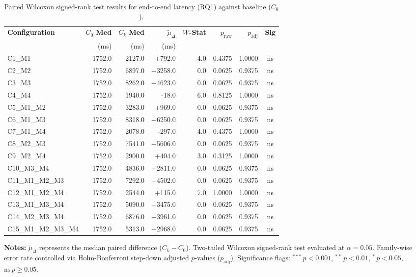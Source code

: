 \begin{table}[!htbp]
\centering
\small
\caption{Paired Wilcoxon signed-rank test results for end-to-end latency (RQ1) against baseline ($C_0$).}
\label{tab:wilcoxon_rq1}
\begin{tabular*}{\textwidth}{@{\extracolsep{\fill}} l r r r r r r c @{}}
\toprule
\textbf{Configuration} & \textbf{$C_0$ Med} & \textbf{$C_k$ Med} & \textbf{$\tilde{\mu}_\Delta$} & \textbf{$W$-Stat} & \textbf{$p_{\text{raw}}$} & \textbf{$p_{\text{adj}}$} & \textbf{Sig} \\
 & \scriptsize{(ms)} & \scriptsize{(ms)} & \scriptsize{(ms)} & & & & \\
\midrule
C1\_M1 & 1752.0 & 2127.0 & +792.0 & 4.0 & 0.4375 & 1.0000 & ns \\
C2\_M2 & 1752.0 & 6897.0 & +3258.0 & 0.0 & 0.0625 & 0.9375 & ns \\
C3\_M3 & 1752.0 & 8262.0 & +4623.0 & 0.0 & 0.0625 & 0.9375 & ns \\
C4\_M4 & 1752.0 & 1940.0 & -18.0 & 6.0 & 0.8125 & 1.0000 & ns \\
C5\_M1\_M2 & 1752.0 & 3283.0 & +969.0 & 0.0 & 0.0625 & 0.9375 & ns \\
C6\_M1\_M3 & 1752.0 & 8318.0 & +6250.0 & 0.0 & 0.0625 & 0.9375 & ns \\
C7\_M1\_M4 & 1752.0 & 2078.0 & -297.0 & 4.0 & 0.4375 & 1.0000 & ns \\
C8\_M2\_M3 & 1752.0 & 7541.0 & +5606.0 & 0.0 & 0.0625 & 0.9375 & ns \\
C9\_M2\_M4 & 1752.0 & 2900.0 & +404.0 & 3.0 & 0.3125 & 1.0000 & ns \\
C10\_M3\_M4 & 1752.0 & 4836.0 & +2811.0 & 0.0 & 0.0625 & 0.9375 & ns \\
C11\_M1\_M2\_M3 & 1752.0 & 7292.0 & +4502.0 & 0.0 & 0.0625 & 0.9375 & ns \\
C12\_M1\_M2\_M4 & 1752.0 & 2544.0 & +115.0 & 7.0 & 1.0000 & 1.0000 & ns \\
C13\_M1\_M3\_M4 & 1752.0 & 5090.0 & +3475.0 & 0.0 & 0.0625 & 0.9375 & ns \\
C14\_M2\_M3\_M4 & 1752.0 & 6876.0 & +3961.0 & 0.0 & 0.0625 & 0.9375 & ns \\
C15\_M1\_M2\_M3\_M4 & 1752.0 & 5313.0 & +2968.0 & 0.0 & 0.0625 & 0.9375 & ns \\
\bottomrule
\end{tabular*}
\vspace{0.5em}
\parbox{\textwidth}{\footnotesize
\textbf{Notes:} $\tilde{\mu}_\Delta$ represents the median paired difference ($C_k - C_0$). Two-tailed Wilcoxon signed-rank test evaluated at $\alpha = 0.05$. Family-wise error rate controlled via Holm-Bonferroni step-down adjusted $p$-values ($p_{\text{adj}}$). Significance flags: $^{***}\,p < 0.001$, $^{**}\,p < 0.01$, $^{*}\,p < 0.05$, $\text{ns}\,p \ge 0.05$.}
\end{table}

